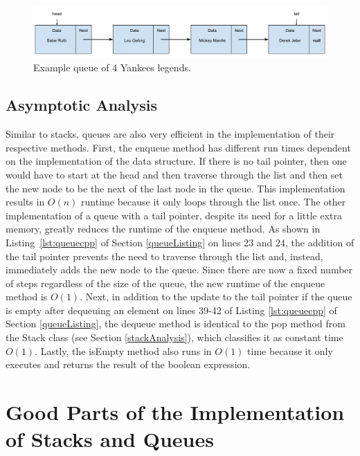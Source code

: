 \documentclass[letterpaper, 10pt,DIV=13]{scrartcl}
\numberwithin{equation}{section} %
\numberwithin{figure}{section} %
\numberwithin{table}{section} %
\begin{document}
\begin{figure}[ht] 
    \centering 
    \includegraphics[width=15cm]{queue}
    \caption{Example queue of 4 Yankees legends.}
    \label{figure:queue}
\end{figure}

\subsection{Asymptotic Analysis}\label{queueAnalysis}
Similar to stacks, queues are also very efficient in the implementation of their respective methods. First, the enqueue method has different run times dependent on the implementation of the data structure. If there is no tail pointer, then one would have to start at the head and then traverse through the list and then set the new node to be the next of the last node in the queue. This implementation results in $O(n)$ runtime because it only loops through the list once. The other implementation of a queue with a tail pointer, despite its need for a little extra memory, greatly reduces the runtime of the enqueue method. As shown in Listing~\ref{lst:queuecpp} of Section \ref{queueListing} on lines 23 and 24, the addition of the tail pointer prevents the need to traverse through the list and, instead, immediately adds the new node to the queue. Since there are now a fixed number of steps regardless of the size of the queue, the new runtime of the enqueue method is $O(1)$. Next, in addition to the update to the tail pointer if the queue is empty after dequeuing an element on lines 39-42 of Listing \ref{lst:queuecpp} of Section \ref{queueListing}, the dequeue method is identical to the pop method from the Stack class (see Section \ref{stackAnalysis}), which classifies it as constant time $O(1)$. Lastly, the isEmpty method also runs in $O(1)$ time because it only executes and returns the result of the boolean expression.

\section{Good Parts of the Implementation of Stacks and Queues}
\end{document}
